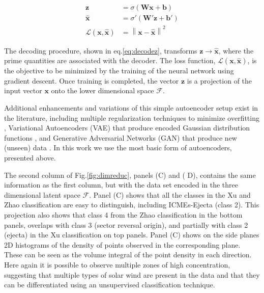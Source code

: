 \begin{align}
\boldsymbol{z} & = \sigma \left( \boldsymbol{W}\boldsymbol{x} + \boldsymbol{b} \right) \label{eq:encodex} \\
\boldsymbol{\hat{x}} & = \sigma' \left( \boldsymbol{W'}\boldsymbol{z} + \boldsymbol{b'} \right) \label{eq:decodez} \\ 
\mathcal{L}(\boldsymbol{x}, \boldsymbol{\hat{x}}) & =  \left\lVert \boldsymbol{x}- \boldsymbol{\hat{x}} \right\rVert^2 \label{eq:aeloss}
\end{align}

The decoding procedure, shown in eq.\eqref{eq:decodez}, transforms $\boldsymbol{z}\rightarrow\boldsymbol{\hat{x}}$, where the prime quantities are associated with the decoder. The loss function, $\mathcal{L}(\boldsymbol{x}, \boldsymbol{\hat{x}})$, is the objective to be minimized by the training of the neural network using gradient descent. Once training is completed, the vector $\boldsymbol{z}$ is a projection of the input vector $\boldsymbol{x}$ onto the lower dimensional space $\boldsymbol{\mathcal{F}}$.

Additional enhancements and variations of this simple autoencoder setup exist in the literature, including multiple regularization techniques to minimize overfitting \citep{7407967}, Variational Autoencoders (VAE) that produce encoded Gaussian distribution functions \citep{Kingma2013}, and Generative Adversarial Networks (GAN) that produce new (unseen) data \citep{Goodfellow2014}. In this work we use the most basic form of autoencoders, presented above.

The second column of Fig.\ref{fig:dimreduc}, panels (C) and (
D), contains the same information as the first column, but with the data set encoded in the three dimensional latent space $\boldsymbol{\mathcal{F}}$. Panel (C) shows that all the classes in the Xu and Zhao classification are easy to distinguish, including ICMEs-Ejecta (class 2). This projection also shows that class 4 from the Zhao classification in the bottom panels, overlaps with class 3 (sector reversal origin), and partially with class 2 (ejecta) in the Xu classification on top panels. Panel (C) shows on the side planes 2D histograms of the density of points observed in the corresponding plane. These can be seen as the volume integral of the point density in each direction. Here again it is possible to observe multiple zones of high concentration, suggesting that multiple types of solar wind are present in the data and that they can be differentiated using an unsupervised classification technique. 

